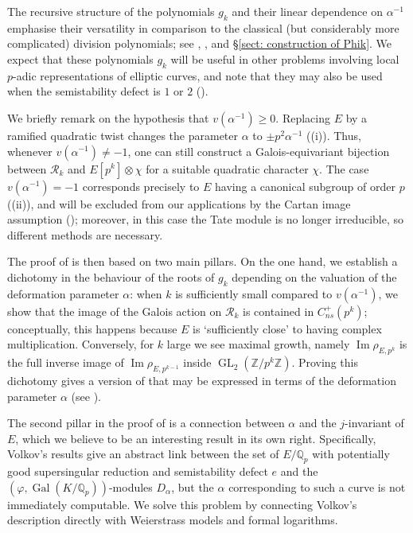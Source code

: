 \documentclass{amsart}
\newcommand{\op}[1]{\operatorname{#1}}
\newcommand{\Qp}{\mathbb{Q}_p}
\theoremstyle{definition}
\newcommand{\Z}{\mathbb{Z}}
\newcommand{\Q}{\mathbb{Q}}
\newcommand{\Gal}{\operatorname{Gal}}
\numberwithin{theorem}{section}
\numberwithin{equation}{section}
\begin{document}
The recursive structure of the polynomials $g_k$ and their linear dependence on $\alpha^{-1}$ emphasise their versatility in comparison to the classical (but considerably more complicated) division polynomials; see , , and \S\ref{sect: construction of Phik}. We expect that these polynomials $g_k$ will be useful in other problems involving local $p$-adic representations of elliptic curves, and note that they may also be used when the semistability defect is $1$ or $2$ ().

We briefly remark on the hypothesis that $v(\alpha^{-1}) \geq 0$. Replacing $E$ by a ramified quadratic twist changes the parameter $\alpha$ to $\pm p^2\alpha^{-1}$ ((i)). Thus, whenever $v(\alpha^{-1}) \ne -1$, one can still construct a Galois-equivariant bijection between $\mathcal{R}_k$ and $E[p^k] \otimes \chi$ for a suitable quadratic character $\chi$. The case $v(\alpha^{-1})=-1$ corresponds precisely to $E$ having a canonical subgroup of order $p$ ((ii)), and will be excluded from our applications by the Cartan image assumption (); moreover, in this case the Tate module is no longer irreducible, so different methods are necessary.

The proof of  is then based on two main pillars. On the one hand, we establish a dichotomy in the behaviour of the roots of $g_k$ depending on the valuation of the deformation parameter $\alpha$: when $k$ is sufficiently small compared to $v(\alpha^{-1})$, we show that the image of the Galois action on $\mathcal{R}_k$ is contained in $C_{ns}^+(p^k)$; conceptually, this happens because $E$ is `sufficiently close' to having complex multiplication. Conversely, for $k$ large we see maximal growth, namely $\op{Im} \rho_{E,p^k}$ is the full inverse image of $\op{Im} \rho_{E,p^{k-1}}$ inside $\op{GL}_2(\Z/p^k\Z)$. Proving this dichotomy gives a version of  that may be expressed in terms of the deformation parameter $\alpha$ (see ).

The second pillar in the proof of  is a connection between $\alpha$ and the $j$-invariant of $E$, which we believe to be an interesting result in its own right.
Specifically, Volkov's results give an abstract link between the set of $E/\Q_p$ with potentially good supersingular reduction and semistability defect $e$ and the $(\varphi,\Gal(K/\Qp))$-modules $D_{\alpha}$, but the $\alpha$ corresponding to such a curve is not immediately computable. We solve this problem by connecting Volkov's description directly with Weierstrass models and formal logarithms.
\end{document}
